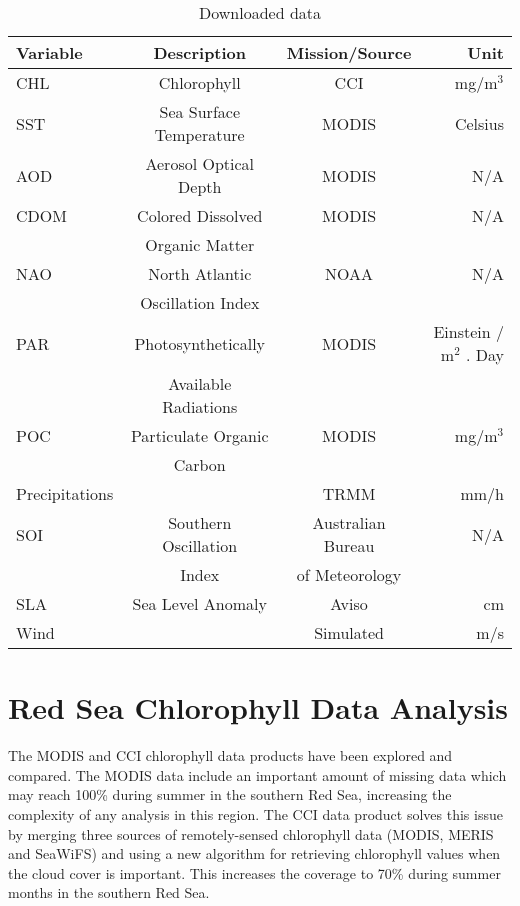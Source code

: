 \begin{table} \centering \begin{tabular}{l c c r} \toprule Variable       &
Description             & Mission/Source    & Unit       \\ \midrule CHL
& Chlorophyll             & CCI               & mg/m${}^3$ \\ SST            &
Sea Surface Temperature & MODIS             & Celsius    \\ AOD            &
Aerosol Optical Depth   & MODIS             & N/A        \\ CDOM           &
Colored Dissolved       & MODIS             & N/A        \\ & Organic Matter
&                   &            \\ NAO            & North Atlantic          &
NOAA              & N/A        \\ & Oscillation Index       &
&            \\ PAR            & Photosynthetically      & MODIS             &
Einstein / m${}^2$ . Day                                                \\ &
Available Radiations    &                   &            \\ POC            &
Particulate Organic     & MODIS             & mg/m${}^3$ \\ & Carbon
&                   &            \\ Precipitations &                         &
TRMM              & mm/h       \\ SOI            & Southern Oscillation    &
Australian Bureau & N/A        \\ & Index                   & of Meteorology
&            \\ SLA            & Sea Level Anomaly       & Aviso             &
cm         \\ Wind           &                         & Simulated         &
m/s        \\ \bottomrule \end{tabular} \caption{Downloaded data}
\label{tab:data} \end{table}

\section{Red Sea Chlorophyll Data Analysis}

The MODIS and CCI chlorophyll data products have been explored and compared.
The MODIS data include an important amount of missing data which may reach
100\% during summer in the southern Red Sea, increasing the complexity of any
analysis in this region. The CCI data product solves this issue by merging
three sources of remotely-sensed chlorophyll data (MODIS, MERIS and SeaWiFS)
and using a new algorithm for retrieving chlorophyll values when the cloud
cover is important.  This increases the coverage to 70\% during summer months
in the southern Red Sea.

